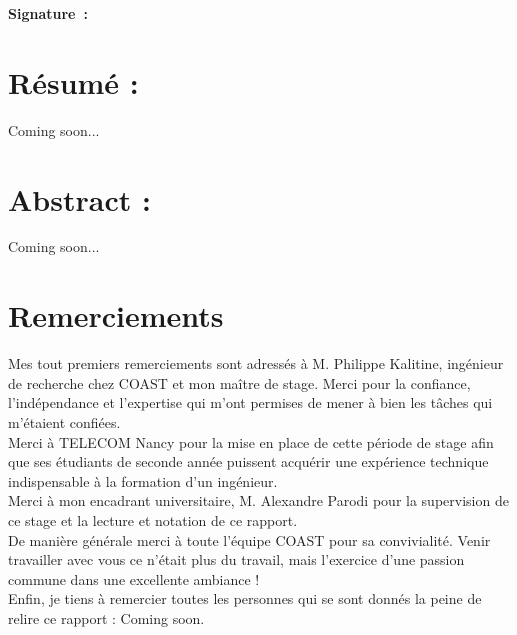 \documentclass[12pt]{article}
\begin{document}
\begin{center}
\textbf{Signature~:}
\end{center}

\newpage
\thispagestyle{empty}
\section*{Résumé :}
Coming soon...

\section*{Abstract :}
Coming soon...



\newpage
\thispagestyle{empty}
\section*{Remerciements}
Mes tout premiers remerciements sont adressés à M. Philippe Kalitine, ingénieur de recherche chez COAST et mon maître de stage. Merci pour la confiance, l'indépendance et l'expertise qui m'ont permises de mener à bien les tâches qui m'étaient confiées.\\

Merci à TELECOM Nancy pour la mise en place de cette période de stage afin que ses étudiants de seconde année puissent acquérir une expérience technique indispensable à la formation d'un ingénieur.\\

Merci à mon encadrant universitaire, M. Alexandre Parodi pour la supervision de ce stage et la lecture et notation de ce rapport.\\

De manière générale merci à toute l'équipe COAST pour sa convivialité. Venir travailler avec vous ce n'était plus du travail, mais l'exercice d'une passion commune dans une excellente ambiance !\\

Enfin, je tiens à remercier toutes les personnes qui se sont donnés la peine de relire ce rapport : Coming soon.

\newpage
\thispagestyle{empty}
\tableofcontents

\newpage
\setcounter{page}{1}
\end{document}
